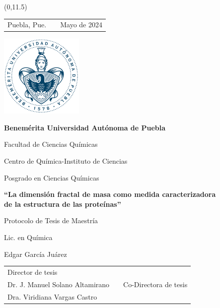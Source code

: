 \documentclass[11pt]{article}
\begin{document}
\begin{titlepage}

\begin{textblock}{3}(0,11.5)
   \begin{tabular}{ccc}
      Puebla, Pue. & \phantom{MMMMMMMMMMMMMMMMM} & Mayo de 2024\phantom{MMMMMM}
   \end{tabular}
\end{textblock}

\centering
\phantom{M}

\vspace{-20mm}
{\includegraphics[width=4cm]{buap} \par}
\vspace{5mm}
{\bfseries\huge Benem\'{e}rita Universidad Aut\'{o}noma de Puebla \par}
\vspace{10mm}
{\Large Facultad de Ciencias Qu\'{i}micas\par}
{\Large Centro de Qu\'{i}mica-Instituto de Ciencias \par}
\vspace{5mm}
{\Large Posgrado en Ciencias Qu\'{i}micas\par}
\vspace{15mm}
{\textbf{``La dimensi\'{o}n fractal de masa como medida caracterizadora\\de la estructura de las prote\'{i}nas''} \par}
\vspace{15mm}
{\large Protocolo de Tesis de Maestr\'{i}a\par}
\vspace{5mm}
{\Large Lic. en Qu\'{i}mica \par}
{\Large Edgar Garc\'{i}a Ju\'{a}rez \par}
\vspace{20mm}


\begin{tabular}{p{}cp{}}
  \cline{1-1} \cline{3-3} \\
  \centering Director de tesis \\ Dr. J. Manuel Solano Altamirano & & \centering Co-Directora de tesis\\ Dra. Viridiana Vargas Castro 
\end{tabular} 

\end{titlepage}
\end{document}
